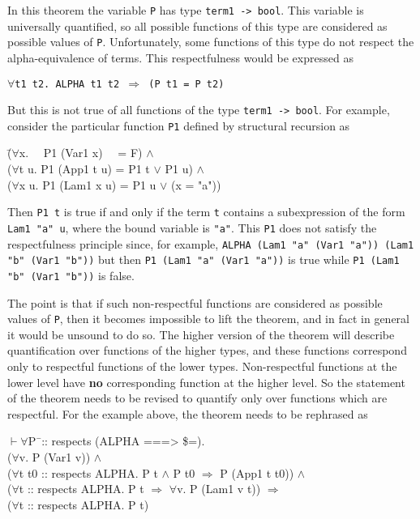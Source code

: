 \documentclass[envcountsame,runningheads]{llncs}
\begin{document}
In this theorem the variable {\tt P} has type {\tt term1 -> bool}.
This variable is universally quantified, so all possible functions of
this type are considered as possible values of {\tt P}.
Unfortunately, some functions of this type do not respect the
alpha-equivalence of terms.  This respectfulness would be expressed as
\begin{center}
{\tt $\forall$t1 t2. ALPHA t1 t2 $\Rightarrow$ (P t1 = P t2)}
\end{center}
But this is not true of all functions
of the type {\tt term1 -> bool}.
For example, consider the particular function {\tt P1} defined by
structural recursion as
{\tt \begin{tabbing}
\hspace{22.0mm}
       \=($\forall$x. \ \ P1 (Var1 x) \ \ = F) $\wedge$ \\
\>     ($\forall$t u. P1 (App1 t u) = P1 t $\vee$ P1 u) $\wedge$ \\
\>     ($\forall$x u. P1 (Lam1 x u) = P1 u $\vee$ (x = "a"))
\end{tabbing}}
Then {\tt P1 t} is true if and only if the term {\tt t} contains
a subexpression of the form {\tt Lam1 "a" u}, where the bound variable
is {\tt "a"}.  This {\tt P1} does not satisfy the respectfulness principle
since, for example, {\tt ALPHA (Lam1 "a" (Var1 "a")) (Lam1 "b" (Var1 "b"))}
but then {\tt P1 (Lam1 "a" (Var1 "a"))} is true while
{\tt P1~(Lam1 "b" (Var1 "b"))} is false.

The point is that if such non-respectful functions are considered as
possible values of {\tt P}, then it becomes impossible to lift the
theorem, and in fact in general it would be unsound to do so.
The higher version of the theorem will describe quantification over
functions of the higher types, and these functions correspond only to
respectful functions of the lower types.  Non-respectful functions at the
lower level have
{\bf no} corresponding function at the higher level.  So the statement of the
theorem needs to be revised to quantify only over functions which are
respectful.
For the example above, the theorem needs to be
rephrased
as
{\tt \begin{tabbing}
$\vdash \forall$P\=\ :: respects (ALPHA ===> \$=). \\
\>     ($\forall$v. P (Var1 v)) $\wedge$ \\
\>     ($\forall$t t0 :: respects ALPHA. P t $\wedge$ P t0 $\Rightarrow$ P (App1 t t0)) $\wedge$ \\
\>     ($\forall$t :: respects ALPHA. P t $\Rightarrow$ $\forall$v. P (Lam1 v t)) $\Rightarrow$ \\
\>     ($\forall$t :: respects ALPHA. P t)
\end{tabbing}}
\end{document}
